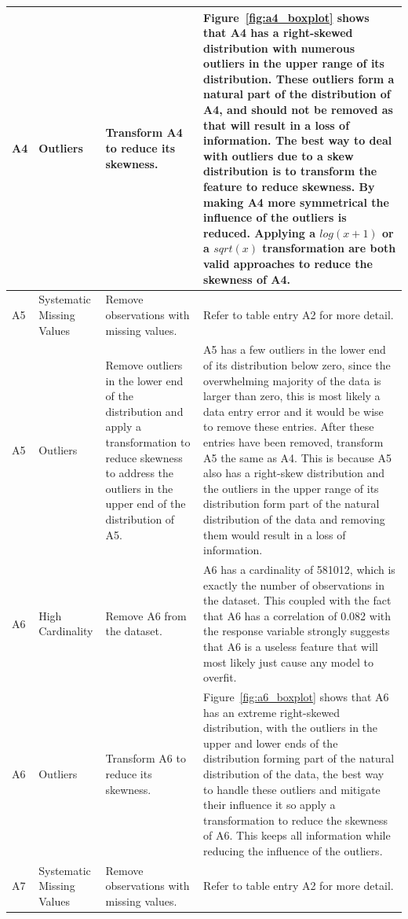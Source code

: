 \documentclass[11pt]{report}
\begin{document}
\begin{longtable}{p{2cm}p{3cm}p{4cm}p{6cm}}
\midrule
A4 & Outliers & Transform A4 to reduce its skewness. & Figure~\ref{fig:a4_boxplot} shows that A4 has a right-skewed distribution with numerous outliers in the upper range of its distribution. These outliers form a natural part of the distribution of A4, and should not be removed as that will result in a loss of information. The best way to deal with outliers due to a skew distribution is to transform the feature to reduce skewness. By making A4 more symmetrical the influence of the outliers is reduced. Applying a $log(x+1)$ or a $sqrt(x)$ transformation are both valid approaches to reduce the skewness of A4. \\
\midrule
A5 & Systematic Missing Values & Remove observations with missing values. & Refer to table entry A2 for more detail. \\
\midrule
A5 & Outliers & Remove outliers in the lower end of the distribution and apply a transformation to reduce skewness to address the outliers in the upper end of the distribution of A5. & A5 has a few outliers in the lower end of its distribution below zero, since the overwhelming majority of the data is larger than zero, this is most likely a data entry error and it would be wise to remove these entries. After these entries have been removed, transform A5 the same as A4. This is because A5 also has a right-skew distribution and the outliers in the upper range of its distribution form part of the natural distribution of the data and removing them would result in a loss of information. \\
\midrule
A6 & High Cardinality & Remove A6 from the dataset. & A6 has a cardinality of 581012, which is exactly the number of observations in the dataset. This coupled with the fact that A6 has a correlation of 0.082 with the response variable strongly suggests that A6 is a useless feature that will most likely just cause any model to overfit. \\
\midrule
A6 & Outliers & Transform A6 to reduce its skewness. & Figure~\ref{fig:a6_boxplot} shows that A6 has an extreme right-skewed distribution, with the outliers in the upper and lower ends of the distribution forming part of the natural distribution of the data, the best way to handle these outliers and mitigate their influence it so apply a transformation to reduce the skewness of A6. This keeps all information while reducing the influence of the outliers. \\
\midrule
A7 & Systematic Missing Values & Remove observations with missing values. & Refer to table entry A2 for more detail. \\

\end{longtable}
\end{document}
